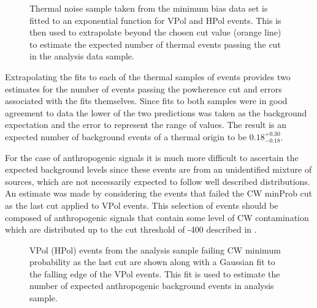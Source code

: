 \begin{figure}[htpb]
\hfill
{}
\caption{Thermal noise sample taken from the minimum bias data set is fitted to an exponential function for VPol and HPol events. This is then used to extrapolate beyond the chosen cut value (orange line) to estimate the expected number of thermal events passing the cut in the analysis data sample.}
\label{fig:Analysis:Background-Estimation:Thermal-Background}
\end{figure}

Extrapolating the fits to each of the thermal samples of events provides two estimates for the number of events passing the powherence cut and errors associated with the fits themselves. Since fits to both samples were in good agreement to data the lower of the two predictions was taken as the background expectation and the error to represent the range of values. The result is an expected number of background events of a thermal origin to be $0.18^{+0.30}_{-0.18}$.

For the case of anthropogenic signals it is much more difficult to ascertain the expected background levels since these events are from an unidentified mixture of sources, which are not necessarily expected to follow well described distributions. An estimate was made by considering the events that failed the CW minProb cut as the last cut applied to VPol events. This selection of events should be composed of anthropogenic signals that contain some level of CW contamination which are distributed up to the cut threshold of -400 described in . 

\begin{figure}[htpb]
\hfill
{}
\caption{VPol (HPol) events from the analysis sample failing CW minimum probability as the last cut are shown along with a Gaussian fit to the falling edge of the VPol events. This fit is used to estimate the number of expected anthropogenic background events in analysis sample.}
\label{fig:Analysis:Background-Estimation:CW-Background}
\end{figure}

